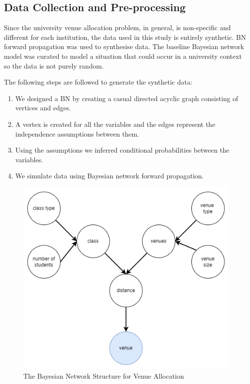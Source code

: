 \documentclass[conference]{IEEEtran}
\begin{document}
\subsection{Data Collection and Pre-processing}
Since the university venue allocation problem, in general, is non-specific and different for each institution, the data used in this study is entirely synthetic. BN forward propagation was used to synthesise data. The baseline Bayesian network model was curated to model a situation that could occur in a university context so the data is not purely random.

The following steps are followed to generate the synthetic data:
\begin{enumerate}
  \item We designed a BN by creating a casual directed acyclic graph consisting of vertices and edges.
  \item A vertex is created for all the variables and the edges represent the independence assumptions between them. 
  \item Using the assumptions we inferred conditional probabilities between the variables.
  \item We simulate data using Bayesian network forward propagation.
\end{enumerate}

\begin{figure}[h]
    \center
  \includegraphics[scale=0.35]{images/Untitled Diagram.drawio (3).png}
  \caption{The Bayesian Network Structure for Venue Allocation}
  \label{fig:boat1}
\end{figure}
\end{document}

